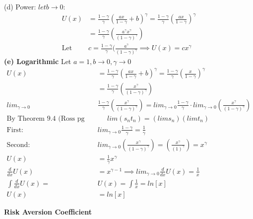 \documentclass[12pt]{article}
\newenvironment{problem}[3][Problem]{\begin{trivlist}
\item[\hskip \labelsep {\bfseries #1}\hskip \labelsep {\bfseries #2.}]}{\end{trivlist}}
\begin{document}
\begin{problem}{6 (HARA)}
\textbf{(d) Power}: $let b \rightarrow 0$: 
\begin{align*}
U(x) &= \frac{1-\gamma }{\gamma } (\frac{ax}{1-\gamma } + b)^{\gamma } = \frac{1-\gamma }{\gamma } (\frac{ax}{1-\gamma })^{\gamma } \\
&= \frac{1-\gamma }{\gamma } (\frac{a^{\gamma }x^{\gamma }}{(1-\gamma )^{\gamma }})  \\
\text{Let }& c= \frac{1-\gamma }{\gamma } (\frac{a^{\gamma }}{(1-\gamma )^{\gamma }} \implies U(x) = cx^{\gamma }
\end{align*}
\textbf{(e) Logarithmic} Let $a=1, b \rightarrow 0, \gamma \rightarrow 0$
\begin{align*}
U(x) &= \frac{1-\gamma }{\gamma } (\frac{ax}{1-\gamma } + b)^{\gamma }=\frac{1-\gamma }{\gamma } (\frac{x}{1-\gamma })^{\gamma } \\
&= \frac{1-\gamma }{\gamma } (\frac{x^{\gamma }}{(1-\gamma )^{\gamma }}) \\
lim_{\gamma\rightarrow 0} &\frac{1-\gamma }{\gamma } (\frac{x^{\gamma }}{(1-\gamma )^{\gamma }}) = lim_{\gamma\rightarrow 0} \frac{1-\gamma }{\gamma } \cdot  lim_{\gamma\rightarrow 0} (\frac{x^{\gamma }}{(1-\gamma )^{\gamma }})\\
\text{By Theorem 9.4 (Ross pg 47)} & \; \; \; \; \; lim(s_nt_n) = (lims_n)(limt_n)\\
\text{First:  }& lim_{\gamma\rightarrow 0} \frac{1-\gamma }{\gamma } = \frac{1}{\gamma } \\
\text{Second:  } & lim_{\gamma\rightarrow 0} (\frac{x^{\gamma }}{(1-\gamma )^{\gamma }})= (\frac{x^{\gamma }}{(1 )^{\gamma }})= x^{\gamma } \\
U(x) &= \frac{1}{\gamma }  x^{\gamma } \\
\frac{d}{dx}U(x) &= x^{\gamma - 1} \implies  lim_{\gamma\rightarrow 0} \frac{d}{dx}U(x) = \frac{1}{x}\\ 
\int \frac{d}{dx}U(x) =& U(x) = \int \frac{1}{x} = ln[x] \\
U(x)& = ln[x]
\end{align*}

\textbf{Risk Aversion Coefficient} 

\end{problem}
\end{document}

